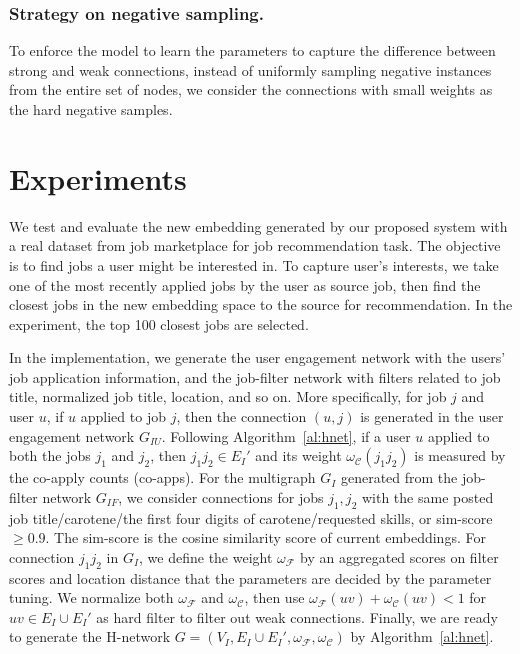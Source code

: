 \documentclass[manuscript,screen,review]{acmart}
\newcommand\Fcal{\mathcal{F}}
\newcommand{\Ccal}{\mathcal{C}}
\begin{document}
\subsubsection{Strategy on negative sampling.} 
To enforce the model to learn the parameters to capture the difference between strong and weak connections, instead of uniformly sampling negative instances from the entire set of nodes, we consider the connections with small weights as the hard negative samples. 

\section{Experiments} \label{Experiments}
We test and evaluate the new embedding generated by our proposed system with a real dataset from job marketplace
for job recommendation task. The objective is to find jobs a user might be interested in. To capture user's interests, we take one of the most recently applied jobs by the user as source job, then find the closest jobs in the new embedding space to the source for recommendation. In the experiment, the top 100 closest jobs are selected.

In the implementation, we generate the user engagement network with the users' job application information, and the job-filter network with filters related to job title, normalized job title, location, and so on. More specifically, for job $j$ and user $u$, if $u$ applied to job $j$, then the connection $(u,j)$ is generated in the user engagement network $G_{IU}$. Following Algorithm~\ref{al:hnet}, if a user $u$ applied to both the jobs $j_1$ and $j_2$, then $j_1j_2\in E_I'$ and its weight $\omega_{\Ccal}(j_1j_2)$ is measured by the co-apply counts (co-apps). For the multigraph $G_I$ generated from the job-filter network $G_{IF}$, we consider connections for jobs $j_1,j_2$ with the same posted job title/carotene/the first four digits of carotene/requested skills, or sim-score $\geq0.9$. The sim-score is the cosine similarity score of current embeddings. For connection $j_1j_2$ in $G_I$, we define the weight $\omega_{\Fcal}$ by an aggregated scores on filter scores and location distance that the parameters are decided by the parameter tuning.  We normalize both $\omega_{\Fcal}$ and $\omega_{\Ccal}$, then use $\omega_{\Fcal}(uv)+\omega_{\Ccal}(uv)<1$ for $uv\in E_I\cup E_I'$ as hard filter to filter out weak connections.
Finally, we are ready to generate the H-network $G=(V_I,E_I\cup E_I',\omega_{\mathcal{F}},\omega_{\mathcal{C}})$ by Algorithm~\ref{al:hnet}.
\end{document}
